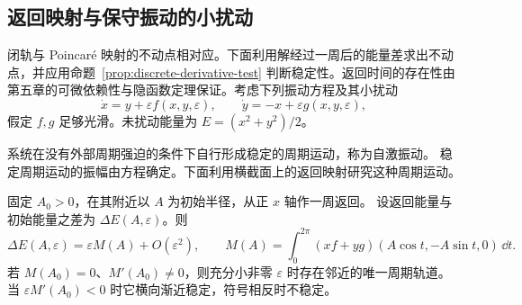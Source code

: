 \subsection*{返回映射与保守振动的小扰动}
\label{sec:perturbed-oscillation}
闭轨与 Poincar\'e 映射的不动点相对应。下面利用解经过一周后的能量差求出不动点，并应用命题~\ref{prop:discrete-derivative-test} 判断稳定性。返回时间的存在性由第五章的可微依赖性与隐函数定理保证。考虑下列振动方程及其小扰动
\[
 \dot x=y+\varepsilon f(x,y,\varepsilon),\qquad
 \dot y=-x+\varepsilon g(x,y,\varepsilon),
\]
假定 $f,g$ 足够光滑。未扰动能量为 $E=(x^2+y^2)/2$。
\begin{definition}
系统在没有外部周期强迫的条件下自行形成稳定的周期运动，称为自激振动。
稳定周期运动的振幅由方程确定。下面利用横截面上的返回映射研究这种周期运动。
\end{definition}
\begin{theorem}[一周能量增量]
固定 $A_0>0$，在其附近以 $A$ 为初始半径，从正 $x$ 轴作一周返回。
设返回能量与初始能量之差为 $\Delta E(A,\varepsilon)$。则
\[
 \Delta E(A,\varepsilon)=\varepsilon M(A)+O(\varepsilon^2),\qquad
 M(A)=\int_0^{2\pi}(xf+yg)(A\cos t,-A\sin t,0)\,\dd t.
\]
若 $M(A_0)=0$、$M'(A_0)\ne0$，则充分小非零 $\varepsilon$ 时存在邻近的唯一周期轨道。
当 $\varepsilon M'(A_0)<0$ 时它横向渐近稳定，符号相反时不稳定。
\end{theorem}
